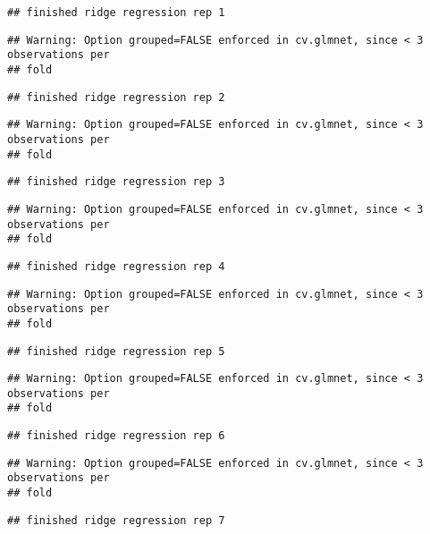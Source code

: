 \documentclass[]{article}
\begin{document}
\begin{verbatim}
## finished ridge regression rep 1
\end{verbatim}

\begin{verbatim}
## Warning: Option grouped=FALSE enforced in cv.glmnet, since < 3 observations per
## fold
\end{verbatim}

\begin{verbatim}
## finished ridge regression rep 2
\end{verbatim}

\begin{verbatim}
## Warning: Option grouped=FALSE enforced in cv.glmnet, since < 3 observations per
## fold
\end{verbatim}

\begin{verbatim}
## finished ridge regression rep 3
\end{verbatim}

\begin{verbatim}
## Warning: Option grouped=FALSE enforced in cv.glmnet, since < 3 observations per
## fold
\end{verbatim}

\begin{verbatim}
## finished ridge regression rep 4
\end{verbatim}

\begin{verbatim}
## Warning: Option grouped=FALSE enforced in cv.glmnet, since < 3 observations per
## fold
\end{verbatim}

\begin{verbatim}
## finished ridge regression rep 5
\end{verbatim}

\begin{verbatim}
## Warning: Option grouped=FALSE enforced in cv.glmnet, since < 3 observations per
## fold
\end{verbatim}

\begin{verbatim}
## finished ridge regression rep 6
\end{verbatim}

\begin{verbatim}
## Warning: Option grouped=FALSE enforced in cv.glmnet, since < 3 observations per
## fold
\end{verbatim}

\begin{verbatim}
## finished ridge regression rep 7
\end{verbatim}
\end{document}
